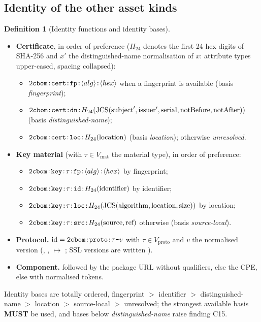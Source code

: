 \documentclass[11pt,a4paper]{article}
\newcommand{\codem}[1]{\texttt{\detokenize{#1}}}
\newcommand{\MUST}{\textbf{MUST}}
\newcommand{\id}{\operatorname{id}}
\newcommand{\JCS}{\operatorname{JCS}}
\theoremstyle{definition}
\newtheorem{definition}{Definition}[section]
\theoremstyle{plain}
\begin{document}
\subsection{Identity of the other asset kinds}
\begin{definition}[Identity functions and identity bases]\label{def:idfun}
\begin{itemize}[nosep]
\item \textbf{Certificate}, in order of preference ($H_{24}$ denotes the first 24 hex digits of
      SHA-256 and $x'$ the distinguished-name normalisation of $x$: attribute types upper-cased,
      spacing collapsed):
      \begin{itemize}[nosep]
      \item $\codem{2cbom:cert:fp:}\langle alg\rangle\codem{:}\langle hex\rangle$ when a fingerprint is available (basis \emph{fingerprint});
      \item $\codem{2cbom:cert:dn:}H_{24}(\JCS(\text{subject}', \text{issuer}', \text{serial}, \text{notBefore}, \text{notAfter}))$ (basis \emph{distinguished-name});
      \item $\codem{2cbom:cert:loc:}H_{24}(\text{location})$ (basis \emph{location}); otherwise \emph{unresolved}.
      \end{itemize}
\item \textbf{Key material} (with $\tau \in V_{\mathrm{mat}}$ the material type), in order of preference:
      \begin{itemize}[nosep]
      \item $\codem{2cbom:key:}\tau\codem{:fp:}\langle alg\rangle\codem{:}\langle hex\rangle$ by fingerprint;
      \item $\codem{2cbom:key:}\tau\codem{:id:}H_{24}(\text{identifier})$ by identifier;
      \item $\codem{2cbom:key:}\tau\codem{:loc:}H_{24}(\JCS(\text{algorithm}, \text{location}, \text{size}))$ by location;
      \item $\codem{2cbom:key:}\tau\codem{:src:}H_{24}(\text{source}, \text{ref})$ otherwise (basis \emph{source-local}).
      \end{itemize}
\item \textbf{Protocol.} $\id = \codem{2cbom:proto:}\tau\codem{-}v$ with $\tau \in V_{\mathrm{proto}}$ and $v$ the normalised version
      (, ,  $\mapsto$ ; SSL versions are written
      ).
\item \textbf{Component.}  followed by the package URL without qualifiers,
      else the CPE, else  with normalised tokens.
\end{itemize}
Identity bases are totally ordered, fingerprint $>$ identifier $>$ distinguished-name $>$ location
$>$ source-local $>$ unresolved; the strongest available basis \MUST{} be used, and bases below
\emph{distinguished-name} raise finding C15.
\end{definition}
\end{document}
